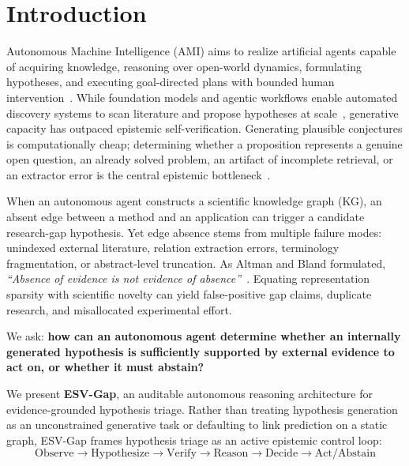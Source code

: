 \documentclass[runningheads]{llncs}
\newcommand{\method}{ESV-Gap}
\begin{document}
\section{Introduction}
\label{sec:intro}

Autonomous Machine Intelligence (AMI) aims to realize artificial agents capable of acquiring knowledge, reasoning over open-world dynamics, formulating hypotheses, and executing goal-directed plans with bounded human intervention~\cite{langley1987,king2009automation,lecun2022path}. While foundation models and agentic workflows enable automated discovery systems to scan literature and propose hypotheses at scale~\cite{aiscientist2024}, generative capacity has outpaced epistemic self-verification. Generating plausible conjectures is computationally cheap; determining whether a proposition represents a genuine open question, an already solved problem, an artifact of incomplete retrieval, or an extractor error is the central epistemic bottleneck~\cite{wadden2020scifact,schneider2022decade}.

When an autonomous agent constructs a scientific knowledge graph (KG), an absent edge between a method and an application can trigger a candidate research-gap hypothesis. Yet edge absence stems from multiple failure modes: unindexed external literature, relation extraction errors, terminology fragmentation, or abstract-level truncation. As Altman and Bland formulated, \emph{``Absence of evidence is not evidence of absence''}~\cite{altman1995absence}. Equating representation sparsity with scientific novelty can yield false-positive gap claims, duplicate research, and misallocated experimental effort.

We ask: \textbf{how can an autonomous agent determine whether an internally generated hypothesis is sufficiently supported by external evidence to act on, or whether it must abstain?}

We present \textbf{\method{}}, an auditable autonomous reasoning architecture for evidence-grounded hypothesis triage. Rather than treating hypothesis generation as an unconstrained generative task or defaulting to link prediction on a static graph, \method{} frames hypothesis triage as an active epistemic control loop:
\begin{equation}
\label{eq:loop}
\text{Observe} \longrightarrow \text{Hypothesize} \longrightarrow \text{Verify} \longrightarrow \text{Reason} \longrightarrow \text{Decide} \longrightarrow \text{Act/Abstain}
\end{equation}
\end{document}
